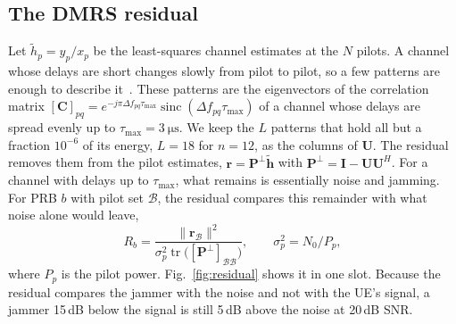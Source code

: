 \documentclass[conference]{IEEEtran}
\newcommand{\Pperp}{\mathbf{P}^{\perp}}
\newcommand{\tr}{\operatorname{tr}}
\begin{document}
\subsection{The DMRS residual}
Let $\tilde{h}_p = y_p / x_p$ be the least-squares channel estimates at the $N$ pilots. A channel
whose delays are short changes slowly from pilot to pilot, so a few patterns are enough to
describe it~\cite{edfors1998ofdm}. These patterns are the eigenvectors of the correlation matrix
$[\mathbf{C}]_{pq} = e^{-j\pi\Delta f_{pq}\tau_{\max}}\operatorname{sinc}(\Delta f_{pq}\tau_{\max})$
of a channel whose delays are spread evenly up to $\tau_{\max} = \SI{3}{\micro\second}$. We keep
the $L$ patterns that hold all but a fraction $10^{-6}$ of its energy, $L = 18$ for $n = 12$, as
the columns of $\mathbf{U}$. The residual removes them from the pilot estimates,
$\mathbf{r} = \Pperp \tilde{\mathbf{h}}$ with $\Pperp = \mathbf{I} - \mathbf{U}\mathbf{U}^H$. For a
channel with delays up to $\tau_{\max}$, what remains is essentially noise and jamming. For PRB $b$
with pilot set $\mathcal{B}$, the residual compares this remainder with what noise alone would
leave,
\begin{equation}
  R_b = \frac{\|\mathbf{r}_{\mathcal{B}}\|^2}{\sigma_p^2 \tr\big([\Pperp]_{\mathcal{B}\mathcal{B}}\big)},
  \qquad \sigma_p^2 = N_0 / P_p,
  \label{eq:residual}
\end{equation}
where $P_p$ is the pilot power. Fig.~\ref{fig:residual} shows it in one slot. Because the
residual compares the jammer with the noise and not with the UE's signal, a jammer 15\,dB below
the signal is still 5\,dB above the noise at 20\,dB SNR.
\end{document}
